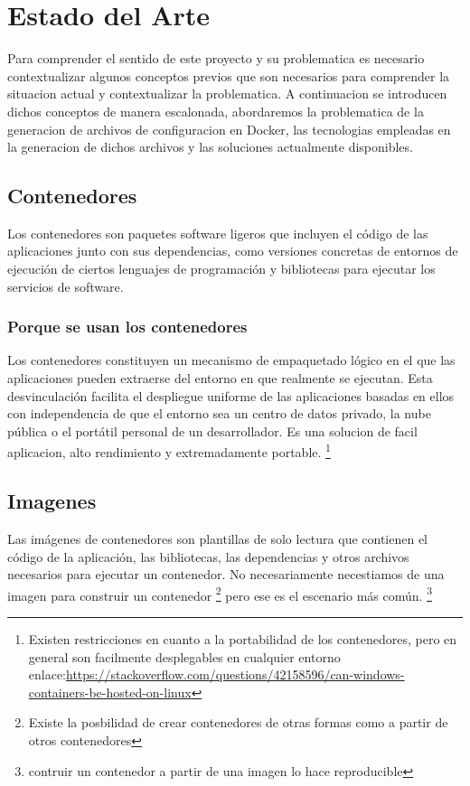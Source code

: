 \documentclass[12pt, a4paper, twoside]{article}
\begin{document}
\section{Estado del Arte}
\label{sec:Estado del Arte}
Para comprender el sentido de este proyecto y su problematica es necesario contextualizar algunos conceptos previos que son necesarios para comprender la situacion actual y contextualizar la problematica.
A continuacion se introducen dichos conceptos de manera escalonada, abordaremos la problematica de la generacion de archivos de configuracion en Docker, las tecnologias empleadas en la generacion de dichos archivos y las soluciones actualmente disponibles.

\subsection{Contenedores}
Los contenedores son paquetes software ligeros que incluyen el código de las aplicaciones junto con sus dependencias, como versiones concretas de entornos de ejecución de ciertos lenguajes de programación y bibliotecas para ejecutar los servicios de software. \cite{googlecontainers}
\subsubsection{Porque se usan los contenedores}
Los contenedores constituyen un mecanismo de empaquetado lógico en el que las aplicaciones pueden extraerse del entorno en que realmente se ejecutan. 
Esta desvinculación facilita el despliegue uniforme de las aplicaciones basadas en ellos con independencia de que el entorno sea un centro de datos privado, la nube pública o el portátil personal de un desarrollador. \cite{googlecontainers}
Es una solucion de facil aplicacion, alto rendimiento y extremadamente portable. \footnote{Existen restricciones en cuanto a la portabilidad de los contenedores, pero en general son facilmente desplegables en cualquier entorno enlace:\href{https://stackoverflow.com/questions/42158596/can-windows-containers-be-hosted-on-linux}{https://stackoverflow.com/questions/42158596/can-windows-containers-be-hosted-on-linux}}
\newpage

\subsection{Imagenes}
Las imágenes de contenedores son plantillas de solo lectura que contienen el código de la aplicación, las bibliotecas, las dependencias y otros archivos necesarios para ejecutar un contenedor. \cite{awsdocker} 
No necesariamente necestiamos de una imagen para construir un contenedor \footnote{Existe la posbilidad de crear contenedores de otras formas como a partir de otros contenedores} pero ese es el escenario más común. \footnote{contruir un contenedor a partir de una imagen lo hace reproducible}
\end{document}
